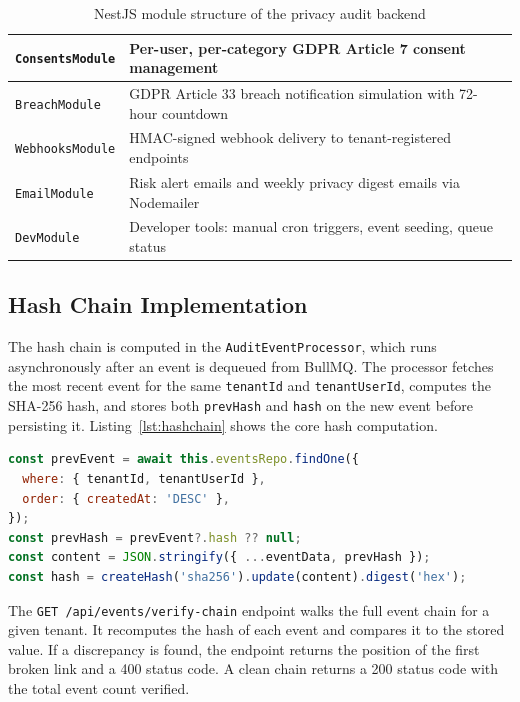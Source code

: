 \documentclass[a4paper,12pt,onecolumn]{report}
\begin{document}
\begin{table}[h]
\begin{center}
\begin{tabularx}{\textwidth}{|l|X|}
            \hline
            \texttt{ConsentsModule} & Per-user, per-category GDPR Article 7 consent management \\
            \hline
            \texttt{BreachModule} & GDPR Article 33 breach notification simulation with 72-hour countdown \\
            \hline
            \texttt{WebhooksModule} & HMAC-signed webhook delivery to tenant-registered endpoints \\
            \hline
            \texttt{EmailModule} & Risk alert emails and weekly privacy digest emails via Nodemailer \\
            \hline
            \texttt{DevModule} & Developer tools: manual cron triggers, event seeding, queue status \\
            \hline
        \end{tabularx}
    \end{center}
    \caption{NestJS module structure of the privacy audit backend}
    \label{tab:modules}
\end{table}

\subsection{Hash Chain Implementation}

The hash chain is computed in the \texttt{AuditEventProcessor}, which runs asynchronously after an event is dequeued from BullMQ.
The processor fetches the most recent event for the same \texttt{tenantId} and \texttt{tenantUserId}, computes the SHA-256 hash, and stores both \texttt{prevHash} and \texttt{hash} on the new event before persisting it.
Listing~\ref{lst:hashchain} shows the core hash computation.

\begin{lstlisting}[language=JavaScript, caption={Hash chain computation in AuditEventProcessor}, label={lst:hashchain}]
const prevEvent = await this.eventsRepo.findOne({
  where: { tenantId, tenantUserId },
  order: { createdAt: 'DESC' },
});
const prevHash = prevEvent?.hash ?? null;
const content = JSON.stringify({ ...eventData, prevHash });
const hash = createHash('sha256').update(content).digest('hex');
\end{lstlisting}

The \texttt{GET /api/events/verify-chain} endpoint walks the full event chain for a given tenant.
It recomputes the hash of each event and compares it to the stored value.
If a discrepancy is found, the endpoint returns the position of the first broken link and a 400 status code.
A clean chain returns a 200 status code with the total event count verified.
\end{document}
